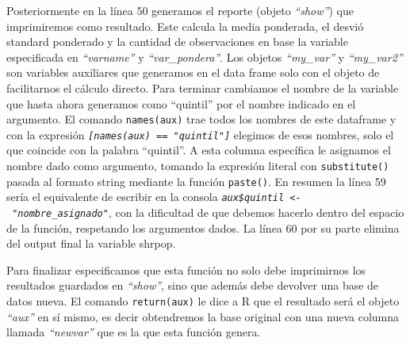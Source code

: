 \documentclass[
]{book}
\begin{document}
Posteriormente en la línea 50 generamos el reporte (objeto \emph{``show''}) que imprimiremos como resultado. Este calcula la media ponderada, el desvió standard ponderado y la cantidad de observaciones en base la variable especificada en \emph{``varname''} y \emph{``var\_pondera''}. Los objetos \emph{``my\_var''} y \emph{``my\_var2''} son variables auxiliares que generamos en el data frame solo con el objeto de facilitarnos el cálculo directo. Para terminar cambiamos el nombre de la variable que hasta ahora generamos como ``quintil'' por el nombre indicado en el argumento. El comando \texttt{names(aux)} trae todos los nombres de este dataframe y con la expresión \emph{\texttt{{[}names(aux)\ ==\ "quintil"{]}}} elegimos de esos nombres, solo el que coincide con la palabra ``quintil''. A esta columna específica le asignamos el nombre dado como argumento, tomando la expresión literal con \texttt{substitute()} pasada al formato string mediante la función \texttt{paste()}. En resumen la línea 59 sería el equivalente de escribir en la consola \emph{\texttt{aux\$quintil\ \textless{}-\ "nombre\_asignado"}}, con la dificultad de que debemos hacerlo dentro del espacio de la función, respetando los argumentos dados. La línea 60 por su parte elimina del output final la variable shrpop.

Para finalizar especificamos que esta función no solo debe imprimirnos los resultados guardados en \emph{``show''}, sino que además debe devolver una base de datos nueva. El comando \texttt{return(aux)} le dice a R que el resultado será el objeto \emph{``aux''} en sí mismo, es decir obtendremos la base original con una nueva columna llamada \emph{``newvar''} que es la que esta función genera.
\end{document}
